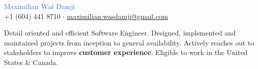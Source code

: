 \documentclass[11pt]{article}
\newcommand{\headinginline}[2]{
    \begin{minipage}[t]{0.55\textwidth}
    \vspace*{\fill}
    #1
    \end{minipage}
    \begin{minipage}[t]{0.45\textwidth}
    \begin{flushright}
    \vspace*{\fill}
    \vspace{8px}
    #2
    \end{flushright}
    \end{minipage}
}
\newcommand{\github}[1]{\href{https://github.com/#1/}{github.com/#1}}
\newcommand{\email}[1]{\href{mailto:#1}{#1}}
\newcommand{\linkedin}[1]{\href{https://www.linkedin.com/in/#1/}{#1}}
\begin{document}

\begin{flushright}
\end{flushright}

\begin{center}
    {
        \Huge
        \textcolor{RoyalBlue}{Maximilian Waś Damji} \\
    }
    \faPhone{}
    +1 (604) 441 8710 $\cdot$
    \faEnvelope{}
    \email{maximilian.wasdamji@gmail.com}
\end{center}

\begin{center}
Detail oriented and efficient Software Engineer. 
Designed, implemented and maintained projects from inception to general availability.
Actively reaches out to stakeholders to improve \textbf{customer experience}.
Eligible to work in the United States \& Canada.
\end{center}






\end{document}
